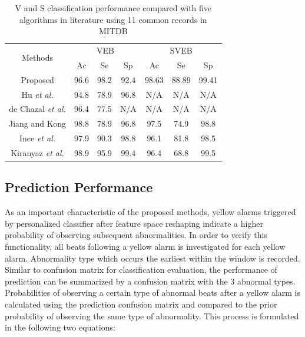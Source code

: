 \begin{table}[tbp]
\centering
\caption{V and S classification performance compared with five algorithms in literature using 11 common records in MITDB}
\label{table:classification_comp}
\begin{tabular}{|c|c|c|c|c|c|c|}
\hline
\multirow{2}{*}{Methods} & \multicolumn{3}{c|}{VEB} & \multicolumn{3}{c|}{SVEB} \\ \cline{2-7} 
                         & Ac     & Se     & Sp     & Ac      & Se     & Sp     \\ \hline
Proposed                 & 96.6   & 98.2   & 92.4   & 98.63   & 88.89  & 99.41  \\ \hline
Hu \textit{et al.}\cite{Hu_et_al}     & 94.8   & 78.9   & 96.8   & N/A     & N/A    & N/A    \\ \hline
de Chazal \textit{et al.}\cite{autofs}  & 96.4   & 77.5   & N/A    & N/A     & N/A    & N/A    \\ \hline
Jiang and Kong \cite{bbnn}    & 98.8   & 78.9   & 96.8   & 97.5    & 74.9   & 98.8   \\ \hline
Ince \textit{et al.} \cite{ince2009generic}    & 97.9   & 90.3   & 98.8   & 96.1    & 81.8   & 98.5   \\ \hline
Kiranyaz \textit{et al.}\cite{Kiranyaz}         & 98.9   & 95.9   & 99.4   & 96.4    & 68.8   & 99.5   \\ \hline
\end{tabular}
\end{table}

\subsection{Prediction Performance}

As an important characteristic of the proposed methods, yellow alarms triggered by personalized classifier after feature space reshaping indicate a higher probability of observing subsequent abnormalities. In order to verify this functionality, all beats following a yellow alarm is investigated for each yellow alarm. Abnormality type which occurs the earliest within the window is recorded. Similar to confusion matrix for classification evaluation, the performance of prediction can be summarized by a confusion matrix with the 3 abnormal types. Probabilities of observing a certain type of abnormal beats after a yellow alarm is calculated using the prediction confusion matrix and compared to the prior probability of observing the same type of abnormality. This process is formulated in the following two equations:

